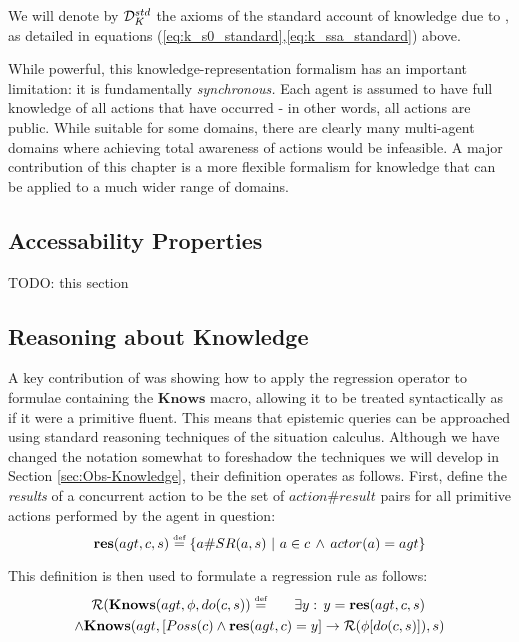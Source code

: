 \medskip{}


\begin{defn}
We will denote by $\mathcal{D}_{K}^{std}$ the axioms of the standard account
of knowledge due to \citep{scherl03sc_knowledge,scherl03conc_knowledge},
as detailed in equations (\ref{eq:k_s0_standard},\ref{eq:k_ssa_standard})
above. 
\end{defn}
While powerful, this knowledge-representation formalism has an important
limitation: it is fundamentally \emph{synchronous.} Each agent is
assumed to have full knowledge of all actions that have occurred -
in other words, all actions are public. While suitable for some domains,
there are clearly many multi-agent domains where achieving total awareness
of actions would be infeasible. A major contribution of this chapter
is a more flexible formalism for knowledge that can be applied to
a much wider range of domains.


\subsection{Accessability Properties}

TODO: this section


\subsection{Reasoning about Knowledge}

A key contribution of \citet{scherl03sc_knowledge} was showing how
to apply the regression operator to formulae containing the $\mathbf{Knows}$
macro, allowing it to be treated syntactically as if it were a primitive
fluent. This means that epistemic queries can be approached using
standard reasoning techniques of the situation calculus. Although
we have changed the notation somewhat to foreshadow the techniques
we will develop in Section \ref{sec:Obs-Knowledge}, their definition
operates as follows. First, define the \emph{results} of a concurrent
action to be the set of $action\#result$ pairs for all primitive
actions performed by the agent in question:\[
\mathbf{res}(agt,c,s)\stackrel{\mbox{\tiny def}}{=}\{a\#SR(a,s)\,\,|\,\, a\in c\,\wedge\, actor(a)=agt\}\]


This definition is then used to formulate a regression rule as follows:\begin{multline}
\mathcal{R}(\mathbf{Knows}(agt,\phi,do(c,s))\stackrel{\mbox{\tiny def}}{=}\,\,\,\,\,\,\,\,\,\,\exists y:\, y=\mathbf{res}(agt,c,s)\,\\
\wedge\mathbf{Knows}(agt,\left[Poss(c)\wedge\mathbf{res}(agt,c)=y\right]\rightarrow\mathcal{R}(\phi[do(c,s)]),s)\label{eq:reg_k_std}\end{multline}


